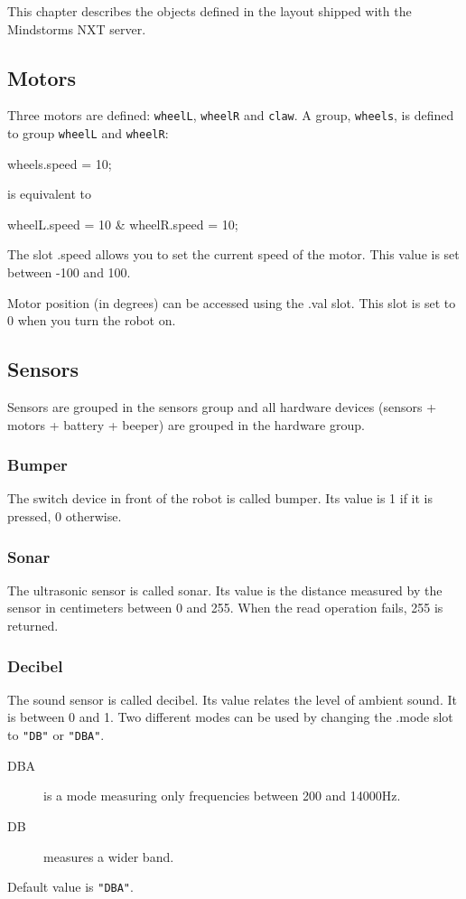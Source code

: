 This chapter describes the objects defined in the  layout
shipped with the \urbi Mindstorms NXT server.
\subsection{Motors}
Three motors are defined: \lstinline{wheelL}, \lstinline{wheelR} and
\lstinline{claw}.  A group, \lstinline{wheels}, is defined to group
\lstinline{wheelL} and \lstinline{wheelR}:
\begin{urbiunchecked}
wheels.speed = 10;
\end{urbiunchecked}

is equivalent to
\begin{urbiunchecked}
  wheelL.speed = 10 & wheelR.speed = 10;
\end{urbiunchecked}

The slot .speed allows you to set the current speed of the motor. This value
is set between -100 and 100.

Motor position (in degrees) can be accessed using the .val slot. This
slot is set to 0 when you turn the robot on.

\subsection{Sensors}
Sensors are grouped in the sensors group and all hardware devices (sensors +
motors + battery + beeper) are grouped in the hardware group.
\subsubsection{Bumper}
The switch device in front of the robot is called bumper. Its value is 1 if
it is pressed, 0 otherwise.
\subsubsection{Sonar}
The ultrasonic sensor is called sonar.  Its value is the distance measured
by the sensor in centimeters between 0 and 255. When the read operation
fails, 255 is returned.
\subsubsection{Decibel}
The sound sensor is called decibel.  Its value relates the level of ambient
sound. It is between 0 and 1.  Two different modes can be used by changing
the .mode slot to \lstinline{"DB"} or \lstinline{"DBA"}.
\begin{description}
\item[DBA] is a mode measuring only frequencies between 200 and 14000Hz.
\item[DB] measures a wider band.
\end{description}
Default value is \lstinline{"DBA"}.

